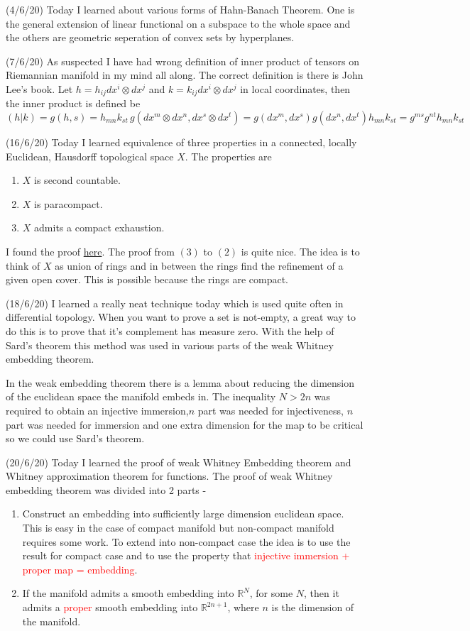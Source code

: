 \documentclass[12pt,a4paper]{article}
\begin{document}
(4/6/20) Today I learned about various forms of Hahn-Banach Theorem. One is the general extension of linear functional on a subspace to the whole space and the others are geometric seperation of convex sets by hyperplanes.

(7/6/20) As suspected I have had wrong definition of inner product of tensors on Riemannian manifold in my mind all along. The correct definition is there is John Lee's book. Let $h = h_{ij}dx^i \otimes dx^j$ and $k = k_{ij}dx^i \otimes dx^j$ in local coordinates, then the inner product is defined be 
\[ (h|k) = g(h,s) = h_{mn}k_{st} \, g(dx^m \otimes dx^n, dx^s \otimes dx^t) = g(dx^m,dx^s) g(dx^n,dx^t) h_{mn}k_{st}  = g^{ms}g^{nt} h_{mn}k_{st} \]

(16/6/20) Today I learned equivalence of three properties in a connected, locally Euclidean, Hausdorff topological space $X$. The properties are 
\begin{enumerate}
\item $X$ is second countable.
\item $X$ is paracompact.
\item $X$ admits a compact exhaustion.
\end{enumerate}
 I found the proof \href{http://people.math.harvard.edu/~hirolee/pdfs/2014-fall-230a-lecture-02-addendum.pdf}{here}. The proof from $(3)$ to $(2)$ is quite nice. The idea is to think of $X$ as union of rings and in between the rings find the refinement of a given open cover. This is possible because the rings are compact.
 
(18/6/20) I learned a really neat technique today which is used quite often in differential topology. When you want to prove a set is not-empty, a great way to do this is to prove that it's complement has measure zero. With the help of Sard's theorem this method was used in various parts of the weak Whitney embedding theorem.

In the weak embedding theorem there is a lemma about reducing the dimension of the euclidean space the manifold embeds in. The inequality $N > 2n$ was required to obtain an injective immersion,$n$ part was needed for injectiveness, $n$ part was needed for immersion and one extra dimension for the map to be critical so we could use Sard's theorem.

(20/6/20) Today I learned the proof of weak Whitney Embedding theorem and Whitney approximation theorem for functions. The proof of weak Whitney embedding theorem was divided into 2 parts -
\begin{enumerate}
\item Construct an embedding into sufficiently large dimension euclidean space. This is easy in the case of compact manifold but non-compact manifold requires some work. To extend into non-compact case the idea is to use the result for compact case and to use the property that \textcolor{red}{injective immersion + proper map = embedding}.
\item If the manifold admits a smooth embedding into $\mathbb{R}^N$, for some $N$, then it admits a \textcolor{red}{proper} smooth embedding into $\mathbb{R}^{2n+1}$, where $n$ is the dimension of the manifold.
\end{enumerate}
\end{document}
